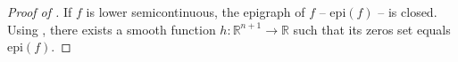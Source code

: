\documentclass{article}
\newcommand*{\cY}{\mathcal{Y}}
\newcommand*{\RR}{\mathbb{R}}
\newcommand{\argmin}{\arg\min}
\newcommand{\firstvar}{x}
\newcommand{\secondvar}{y}
\newcommand{\valoptim}{\varphi_o}
\newcommand{\valpessim}{\varphi_p}
\theoremstyle{plain}
\newtheorem{theorem}{Theorem}[section]
\newtheorem{proposition}[theorem]{Proposition}
\theoremstyle{definition}
\begin{document}
\begin{appendices}




\begin{proof}[Proof of ]
    If $f$ is lower semicontinuous, the epigraph of $f$ -- $\mathrm{epi}(f)$ -- is closed. Using , there exists a smooth function $h: \RR^{n+1} \to \RR$ such that its zeros set equals $\mathrm{epi}(f)$. 
    

\end{proof}
\end{appendices}
\end{document}
